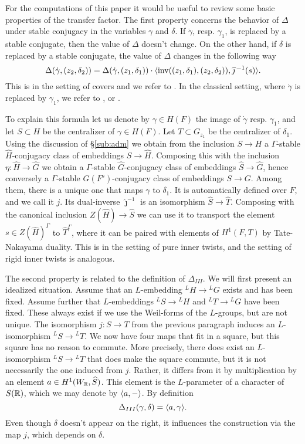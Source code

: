 \documentclass{article}
\theoremstyle{definition}
\numberwithin{equation}{section}
\renewcommand{\-}{\hyp{}}
\begin{document}
For the computations of this paper it would be useful to review some basic properties of the transfer factor. The first property concerns the behavior of $\Delta$ under stable conjugacy in the variables $\gamma$ and $\delta$. If $\dot\gamma$, resp. $\gamma_1$, is replaced by a stable conjugate, then the value of $\Delta$ doesn't change. On the other hand, if $\delta$ is replaced by a stable conjugate, the value of $\Delta$ changes in the following way
\begin{equation} \label{eq:tfstab}
	\Delta(\dot\gamma,(z_2,\delta_2)) = \Delta(\dot\gamma,(z_1,\delta_1)) \cdot \langle\textrm{inv}((z_1,\delta_1),(z_2,\delta_2)),\widehat \jmath\,^{-1}(s)\rangle.
\end{equation}
This is in the setting of covers and we refer to \cite[Lemma 4.3.1]{KalHDC}. In the classical setting, where $\dot\gamma$ is replaced by $\gamma_1$, we refer to \cite[Definitions 4.2.7,4.3.11]{KalIMS}, or \cite[\S4.1]{LS87}.

To explain this formula let us denote by $\gamma \in H(F)$ the image of $\dot\gamma$ resp. $\gamma_1$, and let $S \subset H$ be the centralizer of $\gamma \in H(F)$. Let $T \subset G_{z_1}$ be the centralizer of $\delta_1$. Using the discussion of \S\ref{sub:adm} we obtain from the inclusion $S \to H$ a $\Gamma$-stable $\hat H$-conjugacy class of embeddings $\hat S \to \hat H$. Composing this with the inclusion $\eta : \hat H \to \hat G$ we obtain a $\Gamma$-stable $\hat G$-conjugacy class of embeddings $\hat S \to \hat G$, hence conversely a $\Gamma$-stable $G(F^s)$-conjugacy class of embeddings $S \to G$. Among them, there is a unique one that maps $\gamma$ to $\delta_1$. It is automatically defined over $F$, and we call it $j$. Its dual-inverse $\hat\jmath^{-1}$ is an isomorphism $\hat S \to \hat T$. Composing with the canonical inclusion $Z(\hat H) \to \hat S$ we can use it to transport the element $s \in Z(\hat H)^\Gamma$ to $\hat T^\Gamma$, where it can be paired with elements of $H^1(F,T)$ by Tate-Nakayama duality. This is in the setting of pure inner twists, and the setting of rigid inner twists is analogous.

The second property is related to the definition of $\Delta_{III}$. We will first present an idealized situation. Assume that an $L$\-embedding $^LH \to {^LG}$ exists and has been fixed. Assume further that $L$\-embeddings $^LS \to {^LH}$ and $^LT \to {^LG}$ have been fixed. These always exist if we use the Weil-forms of the $L$\-groups, but are not unique. The isomorphism $j : S \to T$ from the previous paragraph induces an $L$\-isomorphism $^LS \to {^LT}$. We now have four maps that fit in a square, but this square has no reason to commute. More precisely, there does exist an $L$\-isomorphism $^LS \to {^LT}$ that does make the square commute, but it is not necessarily the one induced from $j$. Rather, it differs from it by multiplication by an element $a \in H^1(W_{\mathbb{R}},\widehat S)$. This element is the $L$\-parameter of a character of $S(\mathbb{R})$, which we may denote by $\langle a,-\rangle$. By definition
\[ \Delta_{III}(\gamma,\delta)=\langle a,\gamma\rangle. \]
Even though $\delta$ doesn't appear on the right, it influences the construction via the map $j$, which depends on $\delta$. 
\end{document}
